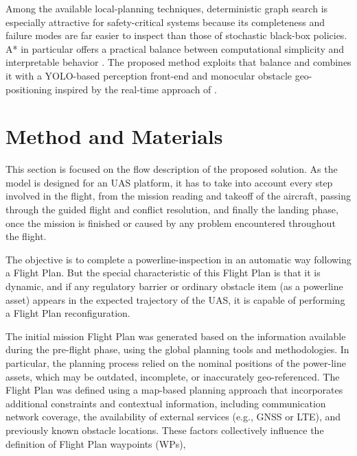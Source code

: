 \documentclass[drones,article,submit,moreauthors]{Definitions/mdpi}
\begin{document}

Among the available local-planning techniques, deterministic graph search is especially attractive for safety-critical systems because its completeness and failure modes are far easier to inspect than those of stochastic black-box policies. A* in particular offers a practical balance between computational simplicity and interpretable behavior \cite{hart1968formal}. The proposed method exploits that balance and combines it with a YOLO-based perception front-end \cite{ultralytics_yolo} and monocular obstacle geo-positioning inspired by the real-time approach of \cite{alaez2023real}.





\section{Method and Materials}

This section is focused on the flow description of the proposed solution. As the model is designed for an UAS platform, it has to take into account every step involved in the flight, from the mission reading and takeoff of the aircraft, passing through the guided flight and conflict resolution, and finally the landing phase, once the mission is finished or caused by any problem encountered throughout the flight. 

The objective is to complete a powerline-inspection in an automatic way following a Flight Plan. But the special characteristic of this Flight Plan is that it is dynamic, and if any regulatory barrier or ordinary obstacle item (as a powerline asset) appears in the expected trajectory of the UAS, it is capable of performing a Flight Plan reconfiguration. 

The initial mission Flight Plan was generated based on the information available during the pre-flight phase, using the global planning tools and methodologies. In particular, the planning process relied on the nominal positions of the power-line assets, which may be outdated, incomplete, or inaccurately geo-referenced. The Flight Plan was defined using a map-based planning approach that incorporates additional constraints and contextual information, including communication network coverage, the availability of external services (e.g., GNSS or LTE), and previously known obstacle locations. These factors collectively influence the definition of Flight Plan waypoints (WPs),
\end{document}
